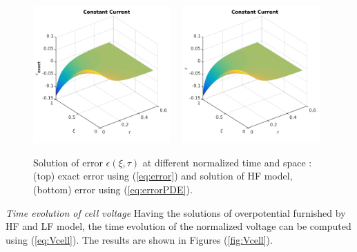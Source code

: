 \documentclass[]{article}
\begin{document}
\begin{figure}[h]
    \centering
    \includegraphics[trim = 0in 0in 0in 0in, clip, width=0.47\textwidth]{figures/error3d_exact.png}
    ~
    \includegraphics[trim = 0in 0in 0in 0in, clip, width=0.47\textwidth]{figures/error3d.png}      
    \caption{Solution of error $\epsilon(\xi,\tau)$ at different normalized time and space : (top) exact error using (\ref{eq:error}) and solution of HF model, (bottom) error using (\ref{eq:errorPDE}).}
    \label{fig:error_3d}
\end{figure}



\textit{Time evolution of cell voltage}
Having the solutions of overpotential furnished by HF and LF model, the time evolution of the normalized voltage can be computed using (\ref{eq:Vcell}). The results are shown in Figures (\ref{fig:Vcell}).
\end{document}
